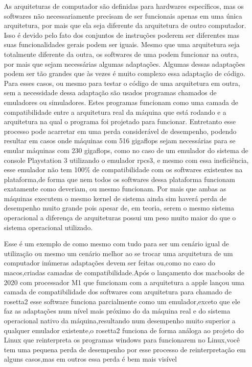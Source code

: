 \documentclass[
	12pt,				%
	openright,			%
	oneside,			%
	a4paper,			%
	english,			%
	french,				%
	spanish,			%
	brazil,				%
	]{abntex2}
\begin{document}
As arquiteturas de computador são definidas para hardwares específicos, mas os softwares não necessariamente precisam de ser funcionais apenas em uma única arquitetura, por mais que ela seja diferente da arquitetura de outro computador. Isso é devido pelo fato dos conjuntos de instruções poderem ser diferentes mas suas funcionalidades gerais podem ser iguais. Mesmo que uma arquitetura seja totalmente diferente da outra, os softwares de uma podem funcionar na outra, por mais que sejam necessárias algumas adaptações. Algumas dessas adaptações podem ser tão grandes que às vezes é muito complexo essa adaptação de código. Para esses casos, ou mesmo para testar o código de uma arquitetura em outra, sem a necessidade dessa adaptação são usados programas chamados de emuladores ou simuladores. Estes programas funcionam como uma camada de compatibilidade entre a arquitetura real da máquina que está rodando e a arquitetura na qual o programa foi projetado para funcionar. Entretanto esse processo pode acarretar em uma perda considerável de desempenho, podendo resultar em casos onde máquinas com  516 gigaflops sejam necessárias para se emular máquinas com 230 gigaflops, como no caso de um emulador do sistema de console Playstation 3 utilizando o emulador rpcs3, e mesmo com essa ineficiência, esse emulador não tem 100\% de compatibilidade com os softwares existentes na plataforma,de forma que nem todos os softwares dessa plataforma funcionam exatamente como deveriam, ou mesmo funcionam. Por mais que ambas as máquinas executem o mesmo kernel de sistema ainda sim haverá perda de desempenho muito grande pois apesar de, em teoria, serem o mesmo sistema operacional a diferença de arquiteturas possui um peso muito maior do que o sistema operacional utilizado.\newline

Esse é um exemplo de como mesmo com tudo para ser um cenário igual de utilização ou mesmo um cenário melhor ao se trocar uma arquitetura de um computador inúmeras adaptações devem ser feitas ou,como no caso do macos,criadas camadas de compatibilidade.Após o lançamento dos macbooks de 2020 com processador M1 que funcionam com a arquitetura  a apple lançou uma camada de compatibilidade dos softwares com arquitetura  para  chamado de rosetta2 esse software funciona parcialmente como um emulador,exceto que ele faz as adaptações num nível mais próximo do da máquina real e do sistema operacional nativo da máquina,resultando num desempenho muito superior a qualquer emulador existente,o rosetta2 funciona de forma análoga ao projeto  do Linux que reinterpreta os programas windows para funcionarem no Linux,você tem uma pequena perda de desempenho por esse processo de reinterpretação em alguns casos,mas em outros essa perda é bem mais visível\newline
\end{document}
